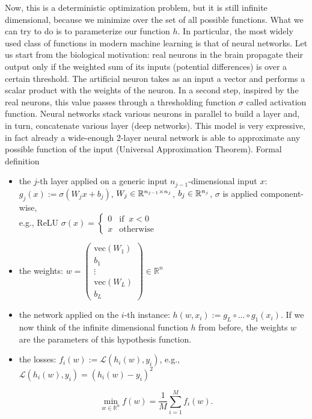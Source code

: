 \documentclass[10pt,a4paper]{article}
\begin{document}
\begin{example}
Now, this is a deterministic optimization problem, but it is still infinite dimensional, because we minimize over the set of all possible functions. What we can try to do is to parameterize our function $h$. In particular, the most widely used class of functions in modern machine learning is that of neural networks. Let us start from the biological motivation: real neurons in the brain propagate their output only if the weighted sum of its inputs (potential differences) is over a certain threshold. The artificial neuron takes as an input a vector and performs a scalar product with the weights of the neuron. In a second step, inspired by the real neurons, this value passes through a thresholding function $\sigma$ called activation function. Neural networks stack various neurons in parallel to build a layer and, in turn, concatenate various layer (deep networks). This model is very expressive, in fact already a wide-enough 2-layer neural network is able to approximate any possible function of the input (Universal Approximation Theorem). Formal definition
	\begin{itemize}
		\item the $j$-th layer applied on a generic input $n_{j-1}$-dimensional input $x$:\\
		$g_j(x) := \sigma (W_j x +b_j )$, $W_j \in \mathbb{R}^{n_{j-1}\times n_j}$, $b_j \in \mathbb{R}^{n_j}$, $\sigma$ is applied component-wise,\\ e.g., ReLU $\sigma(x)= \begin{cases} 0 & \text{if} \;\;x<0\\ x &\text{otherwise} \end{cases}$ %
		\item the weights: $w = \begin{pmatrix}
			\text{vec}(W_1)\\
			b_1\\
			\vdots\\
			\text{vec}(W_L)\\
			b_L
		\end{pmatrix}\in \mathbb{R}^{n}$
		\item the network applied on the $i$-th instance: $h(w, x_i):=g_L \circ \dots \circ g_1(x_i)$. If we now think of the infinite dimensional function $h$ from before, the weights $w$ are the parameters of this hypothesis function.
		\item the losses: $f_i(w):=\mathcal{L}(h_i(w),y_i)$, e.g., $\mathcal{L}(h_i(w),y_i)= (h_i(w)-y_i)^2$%
	\end{itemize}
	
	\begin{equation*}
		\min_{w\in \mathbb{R}^n} f(w) = \frac{1}{M}\sum_{i=1}^{M} f_i(w).
	\end{equation*}
\end{example}
\end{document}
